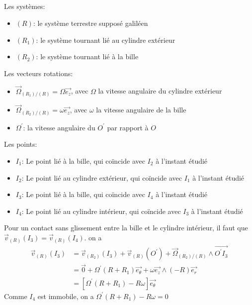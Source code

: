 \documentclass[a4paper,12pt]{book}
\begin{document}
\subsection{}
Les systèmes:
\begin{itemize}
    \item $(R)$: le système terrestre supposé galiléen
    \item $(R_1)$: le système tournant lié au cylindre extérieur
    \item $(R_2)$: le système tournant lié à la bille
\end{itemize}
Les vecteurs rotations:
\begin{itemize}
    \item $\vec{\Omega}_{(R_1)/(R)}=\Omega \vec{e_z}$, avec $\Omega$ la vitesse angulaire du cylindre extérieur
    \item $\vec{\Omega}_{(R_2)/(R)}=\omega \vec{e_z}$, avec $\omega$ la vitesse angulaire de la bille
    \item $\Omega^{'}$: la vitesse angulaire du $O^{'}$ par rapport à $O$
\end{itemize}
Les points:
\begin{itemize}
    \item $I_1$: Le point lié à la bille, qui coïncide avec $I_2$ à l'instant étudié 
    \item $I_2$: Le point lié au cylindre extérieur, qui coïncide avec $I_1$ à l'instant étudié 
    \item $I_3$: Le point lié à la bille, qui coïncide avec $I_4$ à l'instant étudié 
    \item $I_4$: Le point lié au cylindre intérieur, qui coïncide avec $I_3$ à l'instant étudié 
\end{itemize}
Pour un contact sans glissement entre la bille et le cylindre intérieur, il faut que $\vec{v}_{(R)}(I_3)=\vec{v}_{(R)}(I_4)$. 
on a 
\begin{align*}
\vec{v}_{(R)}(I_3)&=\vec{v}_{(R_2)}(I_3)+\vec{v}_{(R)}(O^{'})+\vec{\Omega}_{(R_2)/(R)}\wedge \overrightarrow{O^{'}I_3}\\
&=\vec{0}+\Omega^{'}(R+R_1)\vec{e_\theta}+\omega \vec{e_z}\wedge (-R)\vec{e_r}\\
&=[\Omega^{'}(R+R_1)-R\omega]\vec{e_\theta}
\end{align*}
Comme $I_4$ est immobile, on a $\Omega^{'}(R+R_1)-R\omega=0$
\end{document}
